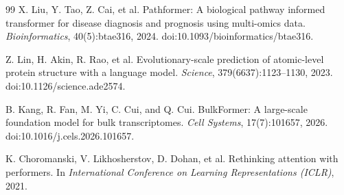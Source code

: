 \documentclass[11pt]{article}
\begin{document}
\begin{thebibliography}{99}
X. Liu, Y. Tao, Z. Cai, et al.
\newblock Pathformer: A biological pathway informed transformer for disease
diagnosis and prognosis using multi-omics data.
\newblock \emph{Bioinformatics}, 40(5):btae316, 2024.
\newblock doi:10.1093/bioinformatics/btae316.

Z. Lin, H. Akin, R. Rao, et al.
\newblock Evolutionary-scale prediction of atomic-level protein structure with
a language model.
\newblock \emph{Science}, 379(6637):1123--1130, 2023.
\newblock doi:10.1126/science.ade2574.

B. Kang, R. Fan, M. Yi, C. Cui, and Q. Cui.
\newblock BulkFormer: A large-scale foundation model for bulk transcriptomes.
\newblock \emph{Cell Systems}, 17(7):101657, 2026.
\newblock doi:10.1016/j.cels.2026.101657.

K. Choromanski, V. Likhosherstov, D. Dohan, et al.
\newblock Rethinking attention with performers.
\newblock In \emph{International Conference on Learning Representations
(ICLR)}, 2021.

\end{thebibliography}
\end{document}
